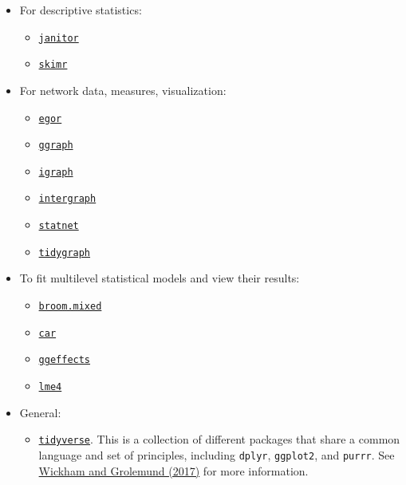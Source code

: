 \documentclass[
]{book}
\providecommand{\tightlist}{%
  \setlength{\itemsep}{0pt}\setlength{\parskip}{0pt}}
\begin{document}
\begin{itemize}
\tightlist
\item
  For descriptive statistics:

  \begin{itemize}
  \tightlist
  \item
    \href{https://cran.r-project.org/web/packages/janitor/vignettes/janitor.html}{\texttt{janitor}}
  \item
    \href{https://cran.r-project.org/web/packages/skimr/vignettes/skimr.html}{\texttt{skimr}}
  \end{itemize}
\item
  For network data, measures, visualization:

  \begin{itemize}
  \tightlist
  \item
    \href{https://github.com/tilltnet/egor}{\texttt{egor}}
  \item
    \href{https://github.com/thomasp85/ggraph}{\texttt{ggraph}}
  \item
    \href{https://igraph.org/}{\texttt{igraph}}
  \item
    \href{https://mbojan.github.io/intergraph/}{\texttt{intergraph}}
  \item
    \href{http://statnet.org/}{\texttt{statnet}}
  \item
    \href{https://github.com/thomasp85/tidygraph}{\texttt{tidygraph}}
  \end{itemize}
\item
  To fit multilevel statistical models and view their results:

  \begin{itemize}
  \tightlist
  \item
    \href{https://cran.r-project.org/web/packages/broom.mixed/vignettes/broom_mixed_intro.html}{\texttt{broom.mixed}}
  \item
    \href{https://cran.r-project.org/web/packages/car/index.html}{\texttt{car}}
  \item
    \href{https://strengejacke.github.io/ggeffects/}{\texttt{ggeffects}}
  \item
    \href{https://github.com/lme4/lme4}{\texttt{lme4}}
  \end{itemize}
\item
  General:

  \begin{itemize}
  \tightlist
  \item
    \href{https://www.tidyverse.org/}{\texttt{tidyverse}}. This is a collection of different packages that share a common language and set of principles, including \texttt{dplyr}, \texttt{ggplot2}, and \texttt{purrr}. See \href{http://r4ds.had.co.nz/}{Wickham and Grolemund (2017)} for more information.
  \end{itemize}
\end{itemize}
\end{document}
